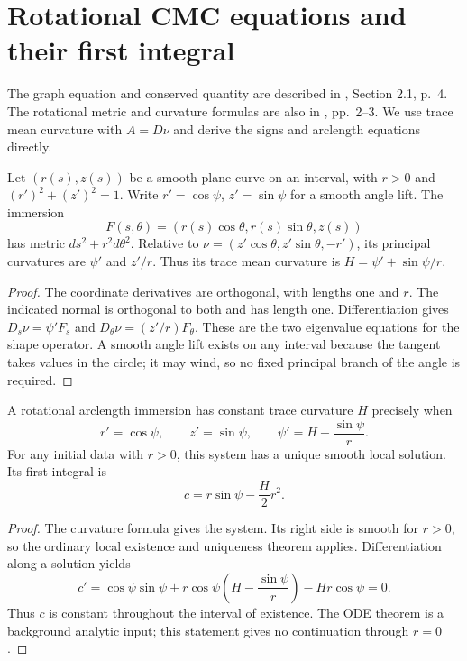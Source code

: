 \chapter{Rotational CMC equations and their first integral}\label{sec:rotational-cmc-equations}
The graph equation and conserved quantity are described in \cite{Maz02}, Section 2.1, p.~4. The rotational metric and curvature formulas are also in \cite{BBM13}, pp.~2--3. We use trace mean curvature with $A=D\nu$ and derive the signs and arclength equations directly.

\begin{proposition}\label{prop:rotational-arclength-curvature}
Let $(r(s),z(s))$ be a smooth plane curve on an interval, with $r>0$ and $(r')^2+(z')^2=1$. Write $r'=\cos\psi$, $z'=\sin\psi$ for a smooth angle lift. The immersion
\[
 F(s,\theta)=(r(s)\cos\theta,r(s)\sin\theta,z(s))
\]
has metric $ds^2+r^2d\theta^2$. Relative to $\nu=(z'\cos\theta,z'\sin\theta,-r')$, its principal curvatures are $\psi'$ and $z'/r$. Thus its trace mean curvature is $H=\psi'+\sin\psi/r$.
\end{proposition}
\begin{proof}
The coordinate derivatives are orthogonal, with lengths one and $r$. The indicated normal is orthogonal to both and has length one. Differentiation gives $D_s\nu=\psi'F_s$ and $D_\theta\nu=(z'/r)F_\theta$. These are the two eigenvalue equations for the shape operator. A smooth angle lift exists on any interval because the tangent takes values in the circle; it may wind, so no fixed principal branch of the angle is required.
\end{proof}

\begin{proposition}\label{prop:rotational-cmc-system}
A rotational arclength immersion has constant trace curvature $H$ precisely when
\[
 r'=\cos\psi,\qquad z'=\sin\psi,\qquad
 \psi'=H-\frac{\sin\psi}{r}.
\]
For any initial data with $r>0$, this system has a unique smooth local solution. Its first integral is
\[
 c=r\sin\psi-\frac H2r^2.
\]
\end{proposition}
\begin{proof}
The curvature formula gives the system. Its right side is smooth for $r>0$, so the ordinary local existence and uniqueness theorem applies. Differentiation along a solution yields
\[
 c'=\cos\psi\sin\psi+r\cos\psi\left(H-\frac{\sin\psi}{r}\right)-Hr\cos\psi=0.
\]
Thus $c$ is constant throughout the interval of existence. The ODE theorem is a background analytic input; this statement gives no continuation through $r=0$.
\end{proof}

